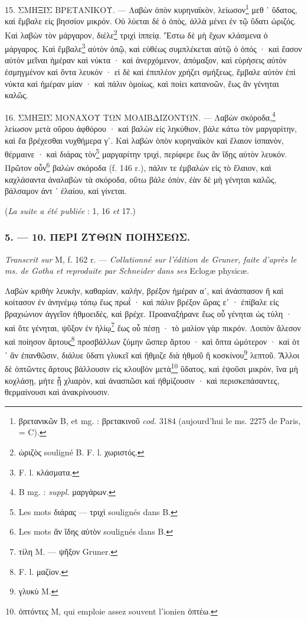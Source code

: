 \documentclass[a4paper, 11pt, oneside, polutonikogreek, french]{article}
\begin{document}
15. ΣΜΗΞΙΣ ΒΡΕΤΑΝΙΚΟΥ. --- Λαβὼν ὀπὸν κυρηναϊκὸν, λείωσον\footnote{βρετανικῶν B, et mg. : βρετακινοῦ \emph{cod.} 3184 (aujourd'hui le ms. 2275 de Paris, = C).} μεθ ᾽ ὕδατος, καὶ ἔμβαλε εἰς βησσίον μικρόν. Οὐ λύεται δὲ ὁ ὀπὸς, ἀλλὰ μένει ἐν τῷ ὕδατι ὡριζός. Καὶ λαβὼν τὸν μάργαρον, διέλε\footnote{ὡριζὸς souligné B. F. l. χωριστός.} τριχὶ ἱππείᾳ. Ἔστω δὲ μὴ ἔχων κλάσμενα ὁ μάργαρος. Καὶ ἔμβαλε\footnote{F. l. κλάσματα.} αὐτὸν ὀπῷ, καὶ εὐθέως συμπλέκεται αὐτῷ ὁ ὀπός · καὶ ἔασον αὐτὸν μεῖναι ἡμέραν καὶ νύκτα · καὶ ἀνερχόμενον, ἀπόμαξον, καὶ εὑρήσεις αὐτὸν ἐσμηγμένον καὶ ὄντα λευκόν · εἰ δὲ καὶ ἐπιπλέον χρήζει σμήξεως, ἔμβαλε αὐτὸν ἐπὶ νύκτα καὶ ἡμέραν μίαν · καὶ πάλιν ὁμοίως, καὶ ποίει κατανοῶν, ἕως ἂν γένηται καλῶς.

16. ΣΜΗΞΙΣ ΜΟΝΑΧΟΥ ΤΩΝ ΜΟΛΙΒΔΙΖΟΝΤΩΝ. --- Λαβὼν σκόροδα,\footnote{B mg. : \emph{suppl.} μαργάρων.} λείωσον μετὰ οὔρου ἀφθόρου · καὶ βαλὼν εἰς ληκύθιον, βάλε κάτω τὸν μαργαρίτην, καὶ ἔα βρέχεσθαι νυχθήμερα γʹ. Καὶ λαβὼν ὀπὸν κυρηναϊκὸν καὶ ἔλαιον ἰσπανὸν, θέρμαινε · καὶ διάρας τὸν\footnote{Les mots διάρας --- τριχὶ soulignés dans B.} μαργαρίτην τριχὶ, περίφερε ἕως ἂν ἴδῃς αὐτὸν λευκόν. Πρῶτον οὖν\footnote{Les mots ἂν ἴδης αὐτὸν soulignés dans B.} βαλὼν σκόροδα (f. 146 r.), πάλιν τε ἐμβαλὼν εἰς τὸ ἔλαιον, καὶ καχλάσαντα ἀναλαβὼν τὰ σκόροδα, οὕτω βάλε ὀπὸν, ἐὰν δὲ μὴ γένηται καλῶς, βάλσαμον ἀντ ᾽ ἐλαίου, καὶ γίνεται.

(\emph{La suite a été publiée} : 1, 16 \emph{et} 17.)

\bigskip
\centerline{\EightStarTaper}
\centerline{\EightStarTaper\EightStarTaper}
\bigskip

\subsubsection{5. --- 10. ΠΕΡΙ ΖΥΘΩΝ ΠΟΙΗΣΕΩΣ.}

\emph{Transcrit sur} M, f. 162 r. --- \emph{Collationné sur l'édition de Gruner, faite d'après le ms. de Gotha et reproduite par Schneider dans ses} Eclogæ physicæ.

Λαβὼν κριθὴν λευκὴν, καθαρίαν, καλὴν, βρέξον ἡμέραν αʹ, καὶ ἀνάσπασον ἢ καὶ κοίτασον ἐν ἀνηνέμῳ τόπῳ ἕως πρωΐ · καὶ πάλιν βρέξον ὥρας εʹ · ἐπίβαλε εἰς βραχιώνιον ἀγγεῖον ἠθμοειδὲς, καὶ βρέχε. Προαναξήρανε ἕως οὗ γένηται ὡς τύλη · καὶ ὅτε γένηται, ψῦξον ἐν ἡλίῳ\footnote{τίλη M. --- ψῆξον Gruner.} ἕως οὗ πέσῃ · τὸ μαλίον γὰρ πικρόν. Λοιπὸν ἄλεσον καὶ ποίησον ἄρτους\footnote{F. l. μαζίον.} προσβάλλων ζύμην ὥσπερ ἄρτου · καὶ ὄπτα ὠμότερον · καὶ ὁτ ᾽ ἂν ἐπανθῶσιν, διάλυε ὕδατι γλυκεῖ καὶ ἤθμιζε διὰ ἠθμοῦ ἢ κοσκίνου\footnote{γλυκὺ M.} λεπτοῦ. Ἄλλοι δὲ ὀπτῶντες ἄρτους βάλλουσιν εἰς κλουβὸν μετὰ\footnote{ὀπτόντες M, qui emploie assez souvent l'ionien ὀπτέω.} ὕδατος, καὶ ἑψοῦσι μικρὸν, ἵνα μὴ κοχλάσῃ, μήτε ᾖ χλιαρὸν, καὶ ἀνασπῶσι καὶ ἠθμίζουσιν · καὶ περισκεπάσαντες, θερμαίνουσι καὶ ἀνακρίνουσιν.
\end{document}
